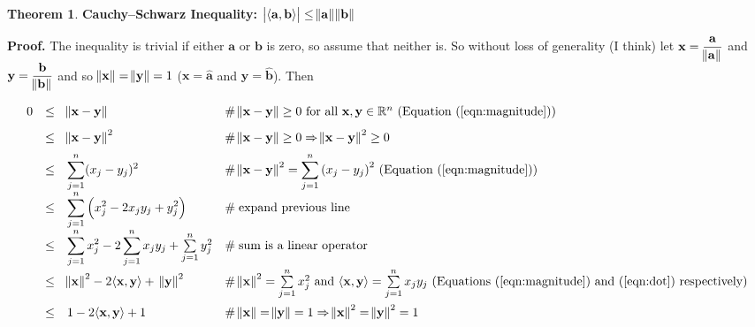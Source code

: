 \documentclass{article}
\theoremstyle{definition}
\newtheorem{theorem}{Theorem}[section]
\begin{document}
\begin{theorem} {\bf Cauchy–Schwarz Inequality:} 
$\big | \langle \mathbf{a},\mathbf{b} \rangle \big | \leq 
\norm{\mathbf{a}} \norm{\mathbf{b}}$


\bigskip
{
\noindent
{\bf Proof.} The inequality is trivial if either $ \mathbf{a}$ or
$\mathbf{b}$ is zero, so assume that neither is. So without loss
of generality (I think) let ${\displaystyle \mathbf{x} =
\frac{\mathbf{a}}{\norm{\mathbf{a}}}}$ and ${\displaystyle
\mathbf{y} = \frac{\mathbf{b}}{\norm{\mathbf{b}}}}$ and so $\norm{
\mathbf{x}} = \norm{\mathbf{y}} = 1$ ($\mathbf{x} =
\mathbf{\hat{a}}$ and $\mathbf{y} = \mathbf{\hat{b}}$).  Then
\par}


\medskip
\begin{equation*}
\begin{array}{lllll}
0
&\leq& \norm{\mathbf{x} - \mathbf{y}}
					&\mathrel{\#} \text{$\norm{\mathbf{x} - \mathbf{y}} \geq 0$ for all 
					$\mathbf{x}, \mathbf{y} \in \mathbb{R}^{n}$ (Equation (\ref{eqn:magnitude}))}\\
[8pt]
&\leq&  {\norm{\mathbf{x} - \mathbf{y}}}^2
					&\mathrel{\#} \norm{\mathbf{x} - \mathbf{y}} \geq 0 
					\Rightarrow  {\norm{\mathbf{x} - \mathbf{y}}}^2 \geq 0 \\ 
[6pt]
&\leq& {\displaystyle \sum\limits_{j = 1}^{n} (x_j - y_j)^2}
					&\mathrel{\#} \text{${\norm{\mathbf{x} - \mathbf{y}}}^2 = {\displaystyle 
					\sum\limits_{j = 1}^{n} {(x_j - y_j)}^2}$ (Equation (\ref{eqn:magnitude}))} \\
[8pt]
&\leq& {\displaystyle \sum\limits_{j = 1}^{n} \left ( x_{j}^2 - 2 x_{j} y_{j} + y_{j}^{2} \right )}
					&\mathrel{\#} \text{expand previous line} \\
[8pt]
&\leq& {\displaystyle \sum\limits_{j = 1}^{n} x_{j}^2 - 2 \sum\limits_{j = 1}^{n} x_{j} y_{j}} 
					+ \sum\limits_{j = 1}^{n} y_{j}^{2}
					&\mathrel{\#} \text{sum is a linear operator} \\
[12pt]
&\leq& {\norm{\mathbf{x}}}^2 - 2 \langle \mathbf{x},\mathbf{y} \rangle + \; {\norm{\mathbf{y}}}^2
					&\mathrel{\#} \text{${\norm{\mathbf{x}}}^2 = \sum\limits_{j = 1}^{n} x_{j}^2$  
					and $\langle \mathbf{x},\mathbf{y} \rangle  = \sum\limits_{j = 1}^{n} x_{j} y_{j}$ 
					(Equations  (\ref{eqn:magnitude}) and (\ref{eqn:dot}) respectively)} \\
[12pt]
&\leq& 1 - 2 \langle \mathbf{x},\mathbf{y} \rangle + 1
					&\mathrel{\#} \norm{\mathbf{x}} = \norm{\mathbf{y}} 
					= 1 \Rightarrow {\norm{\mathbf{x}}}^2 = {\norm{\mathbf{y}}}^2 = 1 \\

\end{array}
\end{equation*}
\end{theorem}
\end{document}
